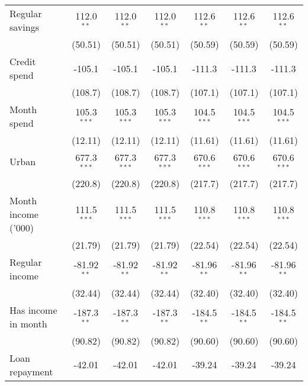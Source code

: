 \begin{table}[htbp]
\begin{footnotesize}
\begin{tabular}{lcccccc}
         Regular savings                  & 112.0$^{**}$  & 112.0$^{**}$  & 112.0$^{**}$  & 112.6$^{**}$  & 112.6$^{**}$  & 112.6$^{**}$\\
                                          & (50.51)       & (50.51)       & (50.51)       & (50.59)       & (50.59)       & (50.59)\\
         Credit spend                     & -105.1        & -105.1        & -105.1        & -111.3        & -111.3        & -111.3\\
                                          & (108.7)       & (108.7)       & (108.7)       & (107.1)       & (107.1)       & (107.1)\\
         Month spend                      & 105.3$^{***}$ & 105.3$^{***}$ & 105.3$^{***}$ & 104.5$^{***}$ & 104.5$^{***}$ & 104.5$^{***}$\\
                                          & (12.11)       & (12.11)       & (12.11)       & (11.61)       & (11.61)       & (11.61)\\
         Urban                            & 677.3$^{***}$ & 677.3$^{***}$ & 677.3$^{***}$ & 670.6$^{***}$ & 670.6$^{***}$ & 670.6$^{***}$\\
                                          & (220.8)       & (220.8)       & (220.8)       & (217.7)       & (217.7)       & (217.7)\\
         Month income ('000)              & 111.5$^{***}$ & 111.5$^{***}$ & 111.5$^{***}$ & 110.8$^{***}$ & 110.8$^{***}$ & 110.8$^{***}$\\
                                          & (21.79)       & (21.79)       & (21.79)       & (22.54)       & (22.54)       & (22.54)\\
         Regular income                   & -81.92$^{**}$ & -81.92$^{**}$ & -81.92$^{**}$ & -81.96$^{**}$ & -81.96$^{**}$ & -81.96$^{**}$\\
                                          & (32.44)       & (32.44)       & (32.44)       & (32.40)       & (32.40)       & (32.40)\\
         Has income in month              & -187.3$^{**}$ & -187.3$^{**}$ & -187.3$^{**}$ & -184.5$^{**}$ & -184.5$^{**}$ & -184.5$^{**}$\\
                                          & (90.82)       & (90.82)       & (90.82)       & (90.60)       & (90.60)       & (90.60)\\
         Loan repayment                   & -42.01        & -42.01        & -42.01        & -39.24        & -39.24        & -39.24\\

\end{tabular}
\end{footnotesize}
\end{table}
